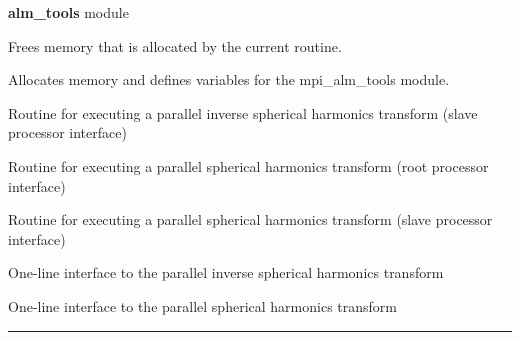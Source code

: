 \begin{modules}
  \begin{sulist}{} %
  \item[\textbf{alm\_tools}] module
  \end{sulist}
\end{modules}

\begin{related}
  \begin{sulist}{} %
   \item[\htmlref{mpi\_cleanup\_alm\_tools}{sub:mpi_cleanup_alm_tools}] Frees memory that is allocated by the current routine. 
   \item[\htmlref{mpi\_initialize\_alm\_tools}{sub:mpi_initialize_alm_tools}] Allocates memory and defines variables for the mpi\_alm\_tools module. 
  \item[\htmlref{mpi\_alm2map\_slave}{sub:mpi_alm2map_slave}] Routine for executing a parallel inverse spherical harmonics transform (slave processor interface)
  \item[\htmlref{mpi\_map2alm}{sub:mpi_map2alm}] Routine for executing a parallel spherical harmonics transform (root processor interface)
  \item[\htmlref{mpi\_map2alm\_slave}{sub:mpi_map2alm_slave}] Routine for executing a parallel spherical harmonics transform (slave processor interface)
  \item[\htmlref{mpi\_alm2map\_simple}{sub:mpi_alm2map_simple}] One-line interface to the parallel inverse spherical harmonics transform 
  \item[\htmlref{mpi\_map2alm\_simple}{sub:mpi_map2alm_simple}] One-line interface to the parallel spherical harmonics transform 
  \end{sulist}
\end{related}

\rule{\hsize}{2mm}

\newpage
